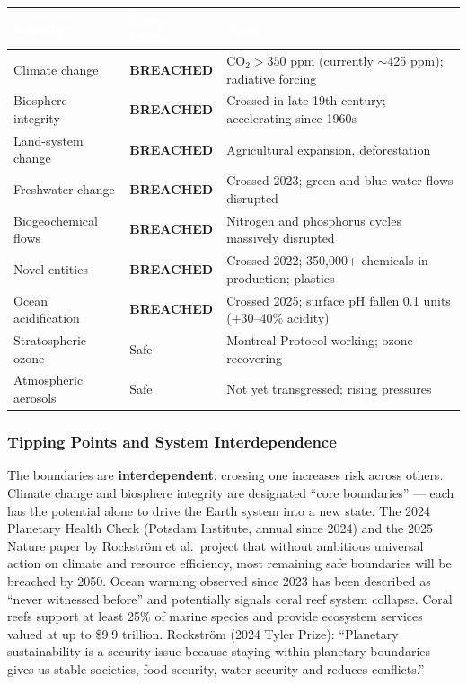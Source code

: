 \documentclass[11pt,letterpaper]{article}
\newcommand{\tableheader}[1]{\textbf{\sffamily\textcolor{white}{#1}}}
\begin{document}
\begin{center}
\begin{tabularx}{\textwidth}{L{4.5cm}C{2.5cm}X}
\toprule
{}
\tableheader{Boundary} & \tableheader{Status (2025)} & \tableheader{Notes} \\
\midrule
Climate change & \textbf{BREACHED} & CO$_2 > 350$ ppm (currently $\sim$425 ppm); radiative forcing \\
Biosphere integrity & \textbf{BREACHED} & Crossed in late 19th century; accelerating since 1960s \\
Land-system change & \textbf{BREACHED} & Agricultural expansion, deforestation \\
Freshwater change & \textbf{BREACHED} & Crossed 2023; green and blue water flows disrupted \\
Biogeochemical flows & \textbf{BREACHED} & Nitrogen and phosphorus cycles massively disrupted \\
Novel entities & \textbf{BREACHED} & Crossed 2022; 350,000+ chemicals in production; plastics \\
Ocean acidification & \textbf{BREACHED} & Crossed 2025; surface pH fallen 0.1 units (+30--40\% acidity) \\
Stratospheric ozone & Safe & Montreal Protocol working; ozone recovering \\
Atmospheric aerosols & Safe & Not yet transgressed; rising pressures \\
\bottomrule
\end{tabularx}
\end{center}

\subsubsection{Tipping Points and System Interdependence}

The boundaries are \textbf{interdependent}: crossing one increases risk across others. Climate change and biosphere integrity are designated ``core boundaries'' --- each has the potential alone to drive the Earth system into a new state. The 2024 Planetary Health Check (Potsdam Institute, annual since 2024) and the 2025 Nature paper by Rockstr{\"o}m et al.\ project that without ambitious universal action on climate and resource efficiency, most remaining safe boundaries will be breached by 2050. Ocean warming observed since 2023 has been described as ``never witnessed before'' and potentially signals coral reef system collapse. Coral reefs support at least 25\% of marine species and provide ecosystem services valued at up to \$9.9 trillion. Rockstr{\"o}m (2024 Tyler Prize): ``Planetary sustainability is a security issue because staying within planetary boundaries gives us stable societies, food security, water security and reduces conflicts.''
\end{document}
